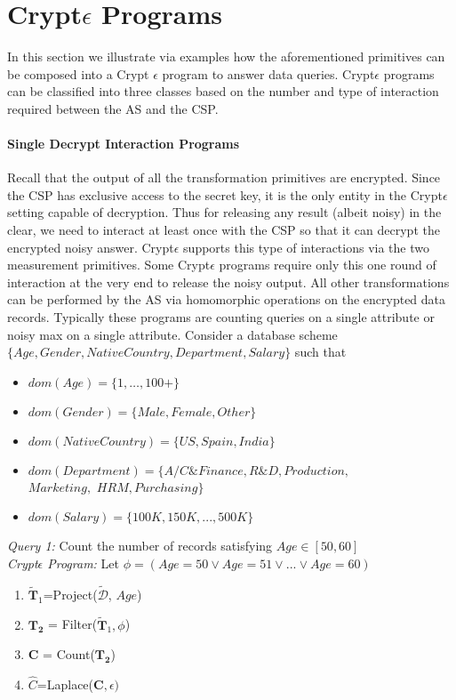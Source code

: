 \section{Crypt$\epsilon$ Programs}\label{program}
In this section we illustrate via examples how the aforementioned primitives can be composed into a Crypt $\epsilon$ program to answer data queries.
Crypt$\epsilon$ programs can be classified into three classes based on the number and type of interaction required between the \textsf{AS} and the \textsf{CSP}.
\paragraph{\textbf{Single Decrypt Interaction Programs}}
Recall that the output of all the transformation primitives are encrypted.  Since  the \textsf{CSP} has exclusive access to the secret key, it is the only entity in the Crypt$\epsilon$ setting capable of decryption. Thus for releasing any result (albeit noisy) in the clear, we need to interact at least once with the \textsf{CSP} so that it can decrypt the encrypted noisy answer. Crypt$\epsilon$ supports this type of interactions via the two measurement primitives. Some Crypt$\epsilon$ programs require only this one round of interaction at the very end to release the noisy output. All other transformations can be performed by the \textsf{AS} via homomorphic operations on the encrypted data records. Typically these programs are counting queries on a single attribute or noisy max on a single attribute. 
Consider a database scheme $\{Age, Gender, NativeCountry, Department, Salary\}$ such that \begin{itemize}\item $dom(Age)=\{1,\ldots,100+\}$  \item $dom(Gender)=\{Male, Female, Other\}$\item $dom(NativeCountry)=\{US,Spain,India\}$ \item $dom(Department)=\{A/C \& Finance, R\&D, Production,$\\$ Marketing,$ $HRM, Purchasing \}$ \item $dom(Salary)=\{100K,150K,...,500K\}$ \end{itemize} 
\begin{exmp}
\textit{Query 1:} Count the number of records satisfying $Age \in [50,60]$\\
\textit{Crypt$\epsilon$ Program:}
Let $\phi=(Age=50 \vee Age=51 \vee ... \vee Age=60)$ 
\begin{enumerate} \item $\mathbf{\tilde{T}}_1$=\textsf{Project}($\boldsymbol{\tilde{\mathcal{D}}}$, $Age$)  \item  $\mathbf{T_2}$ = \textsf{Filter}($\mathbf{\tilde{T}}_1,\phi$)\item $\mathbf{C}$ = \textsf{Count}($\mathbf{T_2}$) \item $\hat{C}$=\textsf{Laplace}($\mathbf{C},\epsilon)$\end{enumerate}
\end{exmp}


